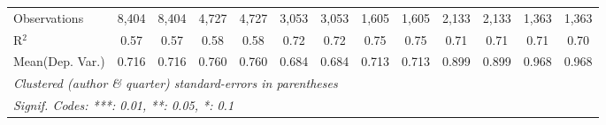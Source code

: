 \begin{tabular}{lcccccccccccc}
   Observations                             & 8,404         & 8,404    & 4,727        & 4,727    & 3,053        & 3,053        & 1,605       & 1,605        & 2,133        & 2,133   & 1,363       & 1,363\\  
   R$^2$                                    & 0.57          & 0.57     & 0.58         & 0.58     & 0.72         & 0.72         & 0.75        & 0.75         & 0.71         & 0.71    & 0.71        & 0.70\\  
Mean(Dep. Var.) & 0.716 & 0.716 & 0.760 & 0.760 & 0.684 & 0.684 & 0.713 & 0.713 & 0.899 & 0.899 & 0.968 & 0.968 \\
   \midrule \midrule
   \multicolumn{13}{l}{\emph{Clustered (author \& quarter) standard-errors in parentheses}}\\
   \multicolumn{13}{l}{\emph{Signif. Codes: ***: 0.01, **: 0.05, *: 0.1}}\\
\end{tabular}
\par\endgroup
